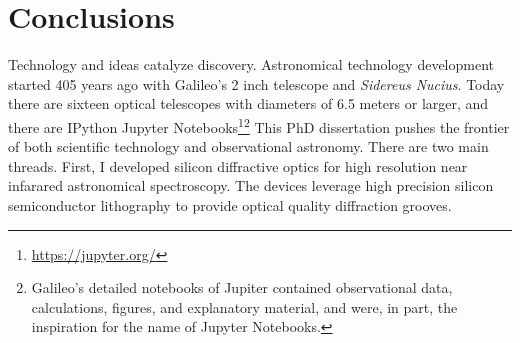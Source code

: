 \section{Conclusions}

Technology and ideas catalyze discovery.  Astronomical technology development started 405 years ago with Galileo's 2 inch telescope and \emph{Sidereus Nucius}.  Today there are sixteen optical telescopes with diameters of 6.5 meters or larger, and there are IPython Jupyter Notebooks\footnote{\url{https://jupyter.org/}}\footnote{Galileo's detailed notebooks of Jupiter contained observational data, calculations, figures, and explanatory material, and were, in part, the inspiration for the name of Jupyter Notebooks.}  This PhD dissertation  pushes the frontier of both scientific technology and observational astronomy.  There are two main threads.  First, I developed silicon diffractive optics for high resolution near infarared astronomical spectroscopy.  The devices leverage high precision silicon semiconductor lithography to provide optical quality diffraction grooves.  